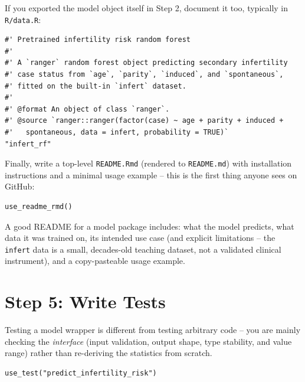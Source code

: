 \documentclass[11pt]{article}
\begin{document}
If you exported the model object itself in Step 2, document it too, typically in \texttt{R/data.R}:

\begin{lstlisting}
#' Pretrained infertility risk random forest
#'
#' A `ranger` random forest object predicting secondary infertility
#' case status from `age`, `parity`, `induced`, and `spontaneous`,
#' fitted on the built-in `infert` dataset.
#'
#' @format An object of class `ranger`.
#' @source `ranger::ranger(factor(case) ~ age + parity + induced +
#'   spontaneous, data = infert, probability = TRUE)`
"infert_rf"
\end{lstlisting}

Finally, write a top-level \texttt{README.Rmd} (rendered to \texttt{README.md}) with installation instructions and a minimal usage example -- this is the first thing anyone sees on GitHub:

\begin{lstlisting}
use_readme_rmd()
\end{lstlisting}

\begin{tipbox}
A good README for a model package includes: what the model predicts, what data it was trained on, its intended use case (and explicit limitations -- the \texttt{infert} data is a small, decades-old teaching dataset, not a validated clinical instrument), and a copy-pasteable usage example.
\end{tipbox}

\section{Step 5: Write Tests}

Testing a model wrapper is different from testing arbitrary code -- you are mainly checking the \emph{interface} (input validation, output shape, type stability, and value range) rather than re-deriving the statistics from scratch.

\begin{lstlisting}
use_test("predict_infertility_risk")
\end{lstlisting}
\end{document}
